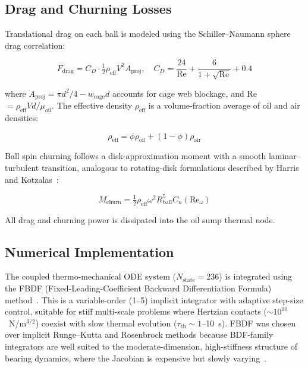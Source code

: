 \documentclass[applsci,article,submit,pdftex,moreauthors]{Definitions/mdpi}
\begin{document}
\subsection{Drag and Churning Losses}
\label{sec:drag}

Translational drag on each ball is modeled using the Schiller--Naumann sphere drag correlation:

\begin{linenomath}
\begin{equation}
    F_{\text{drag}} = C_D \cdot \tfrac{1}{2}\rho_{\text{eff}} V^2 A_{\text{proj}}, \quad C_D = \frac{24}{\text{Re}} + \frac{6}{1+\sqrt{\text{Re}}} + 0.4
    \label{eq:drag}
\end{equation}
\end{linenomath}

where $A_{\text{proj}} = \pi d^2/4 - w_{\text{cage}} d$ accounts for cage web blockage, and Re~$= \rho_{\text{eff}} V d / \mu_{\text{oil}}$. The effective density $\rho_{\text{eff}}$ is a volume-fraction average of oil and air densities:

\begin{linenomath}
\begin{equation}
    \rho_{\text{eff}} = \phi \rho_{\text{oil}} + (1-\phi)\rho_{\text{air}}
    \label{eq:rho_eff}
\end{equation}
\end{linenomath}

Ball spin churning follows a disk-approximation moment with a smooth laminar--turbulent transition, analogous to rotating-disk formulations described by Harris and Kotzalas~\cite{Harris2006}:

\begin{linenomath}
\begin{equation}
    M_{\text{churn}} = \tfrac{1}{2}\rho_{\text{eff}} \omega^2 R_{\text{ball}}^5 C_n(\text{Re}_\omega)
    \label{eq:churn}
\end{equation}
\end{linenomath}

All drag and churning power is dissipated into the oil sump thermal node.


\subsection{Numerical Implementation}
\label{sec:numerical}

The coupled thermo-mechanical ODE system ($N_{\text{state}} = 236$) is integrated using the FBDF (Fixed-Leading-Coefficient Backward Differentiation Formula) method~\cite{Rackauckas2017}. This is a variable-order (1--5) implicit integrator with adaptive step-size control, suitable for stiff multi-scale problems where Hertzian contacts ($\sim 10^{10}$~N/m$^{3/2}$) coexist with slow thermal evolution ($\tau_{\text{th}} \sim 1$--10~s). FBDF was chosen over implicit Runge--Kutta and Rosenbrock methods because BDF-family integrators are well suited to the moderate-dimension, high-stiffness structure of bearing dynamics, where the Jacobian is expensive but slowly varying~\cite{Rackauckas2017}.
\end{document}
